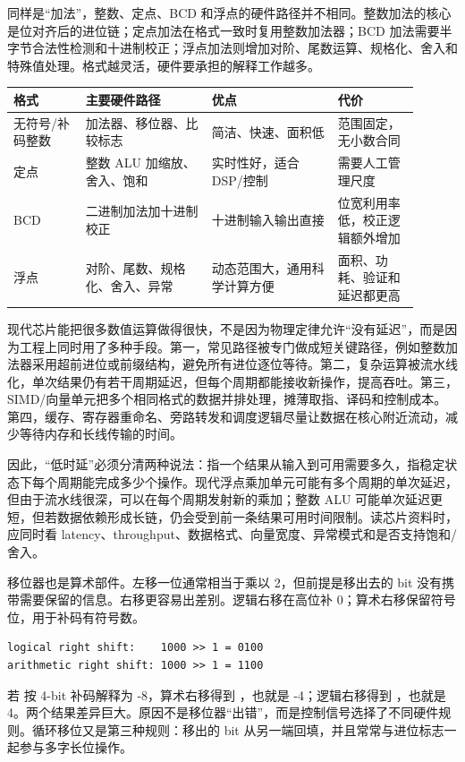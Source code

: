 同样是“加法”，整数、定点、BCD 和浮点的硬件路径并不相同。整数加法的核心是位对齐后的进位链；定点加法在格式一致时复用整数加法器；BCD 加法需要半字节合法性检测和十进制校正；浮点加法则增加对阶、尾数运算、规格化、舍入和特殊值处理。格式越灵活，硬件要承担的解释工作越多。

\begin{longtable}{L{0.16\linewidth}L{0.28\linewidth}L{0.28\linewidth}L{0.18\linewidth}}
\toprule
格式 & 主要硬件路径 & 优点 & 代价 \\
\midrule
无符号/补码整数 & 加法器、移位器、比较标志 & 简洁、快速、面积低 & 范围固定，无小数合同 \\
定点 & 整数 ALU 加缩放、舍入、饱和 & 实时性好，适合 DSP/控制 & 需要人工管理尺度 \\
BCD & 二进制加法加十进制校正 & 十进制输入输出直接 & 位宽利用率低，校正逻辑额外增加 \\
浮点 & 对阶、尾数、规格化、舍入、异常 & 动态范围大，通用科学计算方便 & 面积、功耗、验证和延迟都更高 \\
\bottomrule
\end{longtable}

现代芯片能把很多数值运算做得很快，不是因为物理定律允许“没有延迟”，而是因为工程上同时用了多种手段。第一，常见路径被专门做成短关键路径，例如整数加法器采用超前进位或前缀结构，避免所有进位逐位等待。第二，复杂运算被流水线化，单次结果仍有若干周期延迟，但每个周期都能接收新操作，提高吞吐。第三，SIMD/向量单元把多个相同格式的数据并排处理，摊薄取指、译码和控制成本。第四，缓存、寄存器重命名、旁路转发和调度逻辑尽量让数据在核心附近流动，减少等待内存和长线传输的时间。

因此，“低时延”必须分清两种说法：指一个结果从输入到可用需要多久，指稳定状态下每个周期能完成多少个操作。现代浮点乘加单元可能有多个周期的单次延迟，但由于流水线很深，可以在每个周期发射新的乘加；整数 ALU 可能单次延迟更短，但若数据依赖形成长链，仍会受到前一条结果可用时间限制。读芯片资料时，应同时看 latency、throughput、数据格式、向量宽度、异常模式和是否支持饱和/舍入。

移位器也是算术部件。左移一位通常相当于乘以 2，但前提是移出去的 bit 没有携带需要保留的信息。右移更容易出差别。逻辑右移在高位补 0；算术右移保留符号位，用于补码有符号数。

\begin{lstlisting}
logical right shift:    1000 >> 1 = 0100
arithmetic right shift: 1000 >> 1 = 1100
\end{lstlisting}

若  按 4-bit 补码解释为 -8，算术右移得到 ，也就是 -4；逻辑右移得到 ，也就是 4。两个结果差异巨大。原因不是移位器“出错”，而是控制信号选择了不同硬件规则。循环移位又是第三种规则：移出的 bit 从另一端回填，并且常常与进位标志一起参与多字长位操作。

